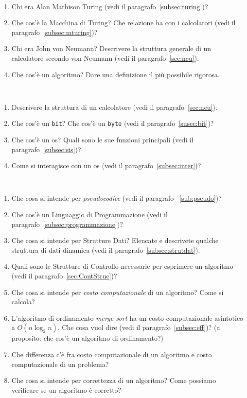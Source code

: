 \begin{description}[]
	\item[Fondamenti e Principi dell'Informatica:]\ 
	\begin{enumerate}
		\item
Chi era Alan Mathison Turing (vedi il paragrafo~\vref{subsec:turing})?
		\item
Che cos'è la Macchina di Turing? Che relazione ha con i calcolatori (vedi il paragrafo~\vref{subsec:mturing})?
		\item
Chi era John von Neumann? Descrivere la struttura generale di un calcolatore secondo von Neumann (vedi il paragrafo~\vref{sec:neu}).
		\item
Che cos'è un algoritmo? Dare una definizione il più possibile rigorosa.
	\end{enumerate}
	\item[Architettura dei Calcolatori e Sistemi Operativi:]\ 
	\begin{enumerate}[resume]
		\item
Descrivere la struttura di un calcolatore (vedi il paragrafo~\vref{sec:neu}).
		\item
 Che cos'è un \lstinline!bit!? Che cos'è un \lstinline!byte! (vedi il paragrafo~\vref{susec:bit})?
		\item
Che cos'è un \ac{os}? Quali sono le sue funzioni principali (vedi il paragrafo~\vref{subsec:sis})?
		\item
Come si interagisce con un \ac{os} (vedi il paragrafo~\vref{subsec:inter})?
	\end{enumerate}
	\item[Algoritmica e programmazione:]\ 
	\begin{enumerate}[resume]
		\item
Che cosa si intende per \emph{pseudocodice} (vedi il paragrafo ~\vref{sub:pseudo})?
		\item
Che cos'è un Linguaggio di Programmazione (vedi il paragrafo~\vref{subsec:programmazione})?
		\item
Che cosa si intende per Strutture Dati? Elencate e descrivete qualche struttura di dati dinamica (vedi il paragrafo~\vref{subsec:strutdat}).
		\item
Quali sono le Strutture di Controllo necessarie per esprimere un algoritmo (vedi il paragrafo~\vref{sec:ContStruc})?
		\item
Che cosa si intende per \emph{costo computazionale} di un algoritmo? Come si calcola?
		\item
L'algoritmo di ordinamento \emph{merge sort} ha un costo computazionale asintotico a $O(n\log_2 n)$. Che cosa vuol dire (vedi il paragrafo~\vref{subsec:eff})? (a proposito: che cos'è un algoritmo di ordinamento?)
		\item
Che differenza c'è fra costo computazionale di un algoritmo e costo computazionale di un problema?
		\item
Che cosa si intende per correttezza di un algoritmo? Come possiamo verificare se un algoritmo è corretto?
	\end{enumerate}
\end{description}

